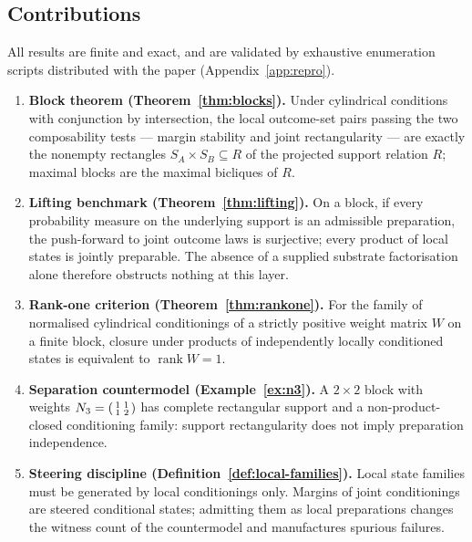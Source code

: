 \documentclass[11pt,a4paper]{article}
\newcommand{\rk}{\operatorname{rank}}
\begin{document}
  \subsection{Contributions}
    \label{ssec:contributions}

    All results are finite and exact, and are validated by exhaustive enumeration scripts distributed with
    the paper (Appendix~\ref{app:repro}).

    \begin{enumerate}
      \item \textbf{Block theorem (Theorem~\ref{thm:blocks}).}
      Under cylindrical conditions with conjunction by intersection, the local outcome-set pairs passing the
      two composability tests --- margin stability and joint rectangularity --- are exactly the nonempty
      rectangles $S_A \times S_B \subseteq R$ of the projected support relation $R$; maximal blocks are the
      maximal bicliques of $R$.
      \item \textbf{Lifting benchmark (Theorem~\ref{thm:lifting}).}
      On a block, if every probability measure on the underlying support is an admissible preparation, the
      push-forward to joint outcome laws is surjective; every product of local states is jointly preparable.
      The absence of a supplied substrate factorisation alone therefore obstructs nothing at this layer.
      \item \textbf{Rank-one criterion (Theorem~\ref{thm:rankone}).}
      For the family of normalised cylindrical conditionings of a strictly positive weight matrix $W$ on a
      finite block, closure under products of independently locally conditioned states is equivalent to
      $\rk W = 1$.
      \item \textbf{Separation countermodel (Example~\ref{ex:n3}).}
      A $2 \times 2$ block with weights $N_3 = \begin{psmallmatrix} 1 & 1 \\ 1 & 2 \end{psmallmatrix}$ has
      complete rectangular support and a non-product-closed conditioning family: support rectangularity does
      not imply preparation independence.
      \item \textbf{Steering discipline (Definition~\ref{def:local-families}).}
      Local state families must be generated by local conditionings only.
      Margins of joint conditionings are steered conditional states; admitting them as local preparations
      changes the witness count of the countermodel and manufactures spurious failures.
    \end{enumerate}
\end{document}
